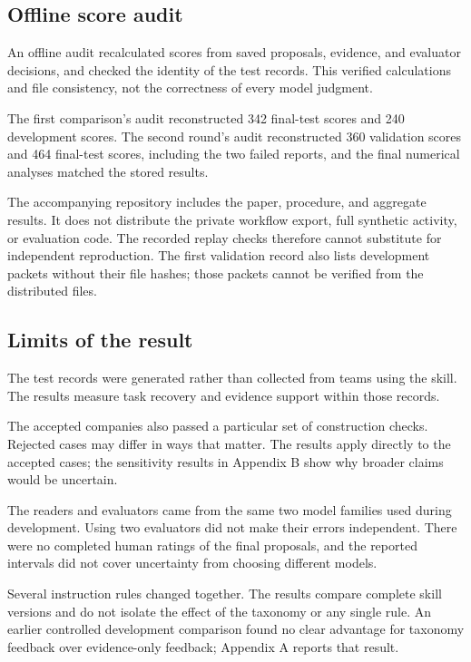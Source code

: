\documentclass[11pt]{article}
\begin{document}
\subsection{Offline score audit}
An offline audit recalculated scores from saved proposals, evidence, and evaluator decisions, and checked the identity of the test records. This verified calculations and file consistency, not the correctness of every model judgment.

The first comparison's audit reconstructed 342 final-test scores and 240 development scores. The second round's audit reconstructed 360 validation scores and 464 final-test scores, including the two failed reports, and the final numerical analyses matched the stored results.

The accompanying repository includes the paper, procedure, and aggregate results. It does not distribute the private workflow export, full synthetic activity, or evaluation code. The recorded replay checks therefore cannot substitute for independent reproduction. The first validation record also lists development packets without their file hashes; those packets cannot be verified from the distributed files.

\subsection{Limits of the result}
The test records were generated rather than collected from teams using the skill. The results measure task recovery and evidence support within those records.

The accepted companies also passed a particular set of construction checks. Rejected cases may differ in ways that matter. The results apply directly to the accepted cases; the sensitivity results in Appendix B show why broader claims would be uncertain.

The readers and evaluators came from the same two model families used during development. Using two evaluators did not make their errors independent. There were no completed human ratings of the final proposals, and the reported intervals did not cover uncertainty from choosing different models.

Several instruction rules changed together. The results compare complete skill versions and do not isolate the effect of the taxonomy or any single rule. An earlier controlled development comparison found no clear advantage for taxonomy feedback over evidence-only feedback; Appendix A reports that result.
\end{document}
